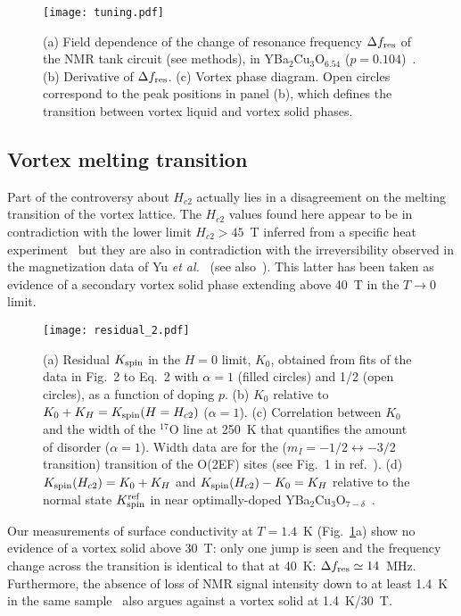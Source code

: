 \documentclass[superscriptaddress,twocolumn,prl,preprintnumbers,amsmath,amssymb]{revtex4}
\begin{document}
\begin{figure}[t!]%
\centerline{\texttt{[image: tuning.pdf]}} %
 \caption{(a) Field dependence of the change of resonance frequency $\Delta f_{\rm res}$ of the NMR tank circuit (see methods), in YBa$_2$Cu$_3$O$_{6.54}$ ($p=0.104$)~\cite{Wu11}. (b) Derivative of $\Delta f_{\rm res}$. (c) Vortex phase diagram. Open circles correspond to the peak positions in panel (b), which defines the transition between vortex liquid and vortex solid phases. }
 \label{tuning}
\end{figure}

\subsection*{Vortex melting transition}

Part of the controversy about $H_{c2}$ actually lies in a disagreement on the melting transition of the vortex lattice. The $H_{c2}$ values found here appear to be in contradiction with the lower limit $H_{c2}>45$~T inferred from a specific heat experiment~\cite{Riggs11} but they are also in contradiction with the irreversibility observed in the magnetization data of Yu {\it et al.}~\cite{Yu16} (see also~\cite{Sebastian08}). This latter has been taken as evidence of a secondary vortex solid phase extending above 40~T in the $T\rightarrow0$ limit.


\begin{figure*}[t!]%
\centerline{\texttt{[image: residual\_2.pdf]}} %
 \caption{(a) Residual $K_{\rm spin}$ in the $H=0$ limit, $K_0$, obtained from fits of the data in Fig.~2 to Eq.~2 with $\alpha =1$ (filled circles) and 1/2 (open circles), as a function of doping $p$. (b) $K_0$ relative to $K_0+K_H=K_{\rm spin}(H=H_{c2})$ ($\alpha =1$). (c) Correlation between $K_0$ and the width of the $^{17}$O line at 250~K that quantifies the amount of disorder ($\alpha =1$).  Width data are for the ($m_I=-1/2 \leftrightarrow -3/2$ transition) transition of the O(2EF) sites (see Fig.~1 in ref.~\cite{Wu15}). (d) $K_{\rm spin}(H_{c2}) = K_0+K_H$ and $K_{\rm spin}(H_{c2}) - K_0 = K_H$ relative to the normal state $K_{\rm spin}^{\rm ref}$ in near optimally-doped YBa$_2$Cu$_3$O$_{7-\delta}$~\cite{Horvatic89}.}
 \label{residual}
\end{figure*}


Our measurements of surface conductivity at $T=1.4$~K (Fig.~\ref{tuning}a) show no evidence of a vortex solid above 30~T: only one jump is seen and the frequency change across the transition is identical to that at 40~K: $\Delta f_{\rm res} \simeq14$~MHz. Furthermore, the absence of loss of NMR signal intensity down to at least 1.4~K in the same sample~\cite{Wu11} also argues against a vortex solid at 1.4~K/30~T.
\end{document}
